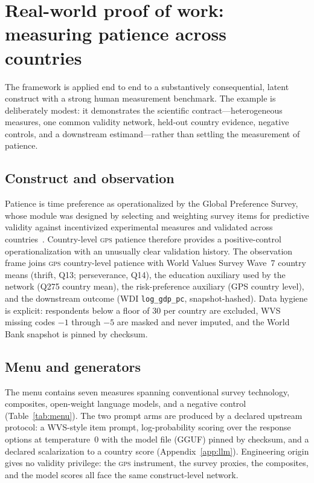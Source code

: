 \documentclass[10pt,letterpaper]{article}
\newcommand{\GPS}{\textsc{gps}}
\begin{document}
\section{Real-world proof of work: measuring patience across countries}
\label{sec:app}

The framework is applied end to end to a substantively consequential, latent construct with a strong human measurement benchmark.
The example is deliberately modest: it demonstrates the scientific contract---heterogeneous measures, one common validity network, held-out country evidence, negative controls, and a downstream estimand---rather than settling the measurement of patience.

\subsection{Construct and observation}
\label{sec:app-construct}

Patience is time preference as operationalized by the Global Preference Survey, whose module was designed by selecting and weighting survey items for predictive validity against incentivized experimental measures and validated across countries~\cite{falk2018,falk2023}.
Country-level \GPS{} patience therefore provides a positive-control operationalization with an unusually clear validation history.
The observation frame joins \GPS{} country-level patience with World Values Survey Wave~7 country means (thrift, Q13; perseverance, Q14), the education auxiliary used by the network (Q275 country mean), the risk-preference auxiliary (GPS country level), and the downstream outcome (WDI \texttt{log\_gdp\_pc}, snapshot-hashed).
Data hygiene is explicit: respondents below a floor of 30 per country are excluded, WVS missing codes $-1$ through $-5$ are masked and never imputed, and the World Bank snapshot is pinned by checksum.

\subsection{Menu and generators}
\label{sec:app-menu}

The menu contains seven measures spanning conventional survey technology, composites, open-weight language models, and a negative control (Table~\ref{tab:menu}).
The two prompt arms are produced by a declared upstream protocol: a WVS-style item prompt, log-probability scoring over the response options at temperature~0 with the model file (GGUF) pinned by checksum, and a declared scalarization to a country score (Appendix~\ref{app:llm}).
Engineering origin gives no validity privilege: the \GPS{} instrument, the survey proxies, the composites, and the model scores all face the same construct-level network.
\end{document}
